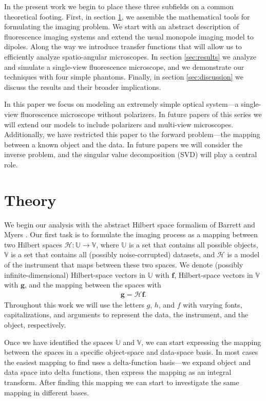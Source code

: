 \documentclass[]{osa-article}
\providecommand{\mb}[1]{\mathbf{#1}}
\providecommand{\mc}[1]{\mathcal{#1}}
\providecommand{\mbb}[1]{\mathbb{#1}}
\begin{document}
In the present work we begin to place these three subfields on a common
theoretical footing. First, in section \ref{sec:theory}, we assemble the
mathematical tools for formulating the imaging problem. We start with an
abstract description of fluorescence imaging systems and extend the usual
monopole imaging model to dipoles. Along the way we introduce transfer functions
that will allow us to efficiently analyze spatio-angular microscopes. In section
\ref{sec:results} we analyze and simulate a single-view fluorescence microscope,
and we demonstrate our techniques with four simple phantoms. Finally, in section
\ref{sec:discussion} we discuss the results and their broader implications.

In this paper we focus on modeling an extremely simple optical system---a
single-view fluorescence microscope without polarizers. In future papers of this
series we will extend our models to include polarizers and multi-view
microscopes. Additionally, we have restricted this paper to the forward
problem---the mapping between a known object and the data. In future papers we
will consider the inverse problem, and the singular value decomposition (SVD)
will play a central role.
 
\section{Theory}\label{sec:theory}
We begin our analysis with the abstract Hilbert space formalism of Barrett and
Myers \cite[ch.~1.3]{barrett2004}. Our first task is to formulate
the imaging process as a mapping between two Hilbert spaces
$\mc{H}: \mbb{U} \rightarrow \mbb{V}$, where $\mbb{U}$ is a set that contains
all possible objects, $\mbb{V}$ is a set that contains all (possibly
noise-corrupted) datasets, and $\mc{H}$ is a model of the instrument that maps
between these two spaces. We denote (possibly infinite-dimensional)
Hilbert-space vectors in $\mbb{U}$ with $\mb{f}$, Hilbert-space vectors in
$\mbb{V}$ with $\mb{g}$, and the mapping between the spaces with
\begin{align}
  \mb{g} = \mc{H}\mb{f}.
\end{align}
Throughout this work we will use the letters $g$, $h$, and $f$ with varying
fonts, capitalizations, and arguments to represent the data, the instrument, and
the object, respectively.

Once we have identified the spaces $\mbb{U}$ and $\mbb{V}$, we can start
expressing the mapping between the spaces in a specific object-space and
data-space basis. In most cases the easiest mapping to find uses a
delta-function basis---we expand object and data space into delta functions,
then express the mapping as an integral transform. After finding this mapping we
can start to investigate the same mapping in different bases.
\end{document}
